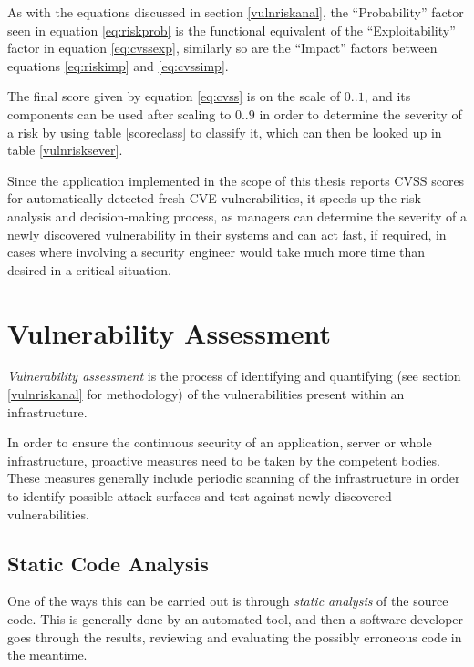 \documentclass[a4paper,12pt]{article}
\begin{document}
	As with the equations discussed in section \ref{vulnriskanal}, the ``Probability'' factor seen in equation \ref{eq:riskprob} is the functional equivalent of the ``Exploitability'' factor in equation \ref{eq:cvssexp}, similarly so are the ``Impact'' factors between equations \ref{eq:riskimp} and \ref{eq:cvssimp}.
	
	The final score given by equation \ref{eq:cvss} is on the scale of $0..1$, and its components can be used after scaling to $0..9$ in order to determine the severity of a risk by using table \ref{scoreclass} to classify it, which can then be looked up in table \ref{vulnrisksever}.
	
	Since the application implemented in the scope of this thesis reports CVSS scores for automatically detected fresh CVE vulnerabilities, it speeds up the risk analysis and decision-making process, as managers can determine the severity of a newly discovered vulnerability in their systems and can act fast, if required, in cases where involving a security engineer would take much more time than desired in a critical situation.
	
\section{Vulnerability Assessment}
 
	
	\textit{Vulnerability assessment} is the process of identifying and quantifying (see section \ref{vulnriskanal} for methodology) of the vulnerabilities present within an infrastructure.
	
	In order to ensure the continuous security of an application, server or whole infrastructure, proactive measures need to be taken by the competent bodies. These measures generally include periodic scanning of the infrastructure in order to identify possible attack surfaces and test against newly discovered vulnerabilities.
	
\subsection{Static Code Analysis} \label{staticcode}
 
	
	One of the ways this can be carried out is through \textit{static analysis} of the source code. This is generally done by an automated tool, and then a software developer goes through the results, reviewing and evaluating the possibly erroneous code in the meantime.
	
\end{document}
